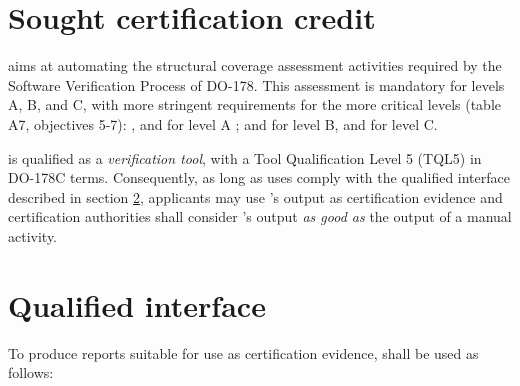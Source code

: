 \documentclass {report}
\begin{document}
\section {Sought certification credit}

\xcov{} aims at automating the structural coverage assessment activities
required by the Software Verification Process of DO-178.
%
This assessment is mandatory for levels A, B, and C, with more stringent
requirements for the more critical levels (table A7, objectives 5-7): \mcdc{},
\dc{} and \stc{} for level A ; \dc{} and \stc{} for level B, and \stc{} for
 level C.

\xcov{} is qualified as a \emph{verification tool}, with a Tool Qualification
Level 5 (TQL5) in DO-178C terms.
%
Consequently, as long as uses comply with the qualified interface described in
section \ref{sec:qual-interface}, applicants may use \xcov{}'s output as
certification evidence and certification authorities shall consider \xcov{}'s
output \emph{as good as} the output of a manual activity.

\section{Qualified interface}
\label{sec:qual-interface}

To produce reports suitable for use as certification evidence, \xcov{} shall
be used as follows:
\end{document}
